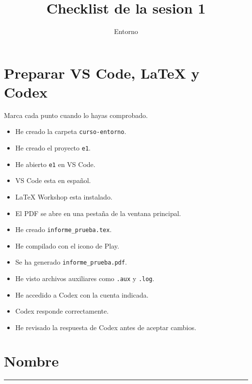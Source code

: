 \documentclass[a4paper,12pt]{article}
\title{Checklist de la sesion 1}
\author{Entorno}
\date{}
\begin{document}
\maketitle

\section*{Preparar VS Code, LaTeX y Codex}

Marca cada punto cuando lo hayas comprobado.

\begin{itemize}
    \item[$\square$] He creado la carpeta \texttt{curso-entorno}.
    \item[$\square$] He creado el proyecto \texttt{e1}.
    \item[$\square$] He abierto \texttt{e1} en VS Code.
    \item[$\square$] VS Code esta en español.
    \item[$\square$] LaTeX Workshop esta instalado.
    \item[$\square$] El PDF se abre en una pestaña de la ventana principal.
    \item[$\square$] He creado \texttt{informe\_prueba.tex}.
    \item[$\square$] He compilado con el icono de Play.
    \item[$\square$] Se ha generado \texttt{informe\_prueba.pdf}.
    \item[$\square$] He visto archivos auxiliares como \texttt{.aux} y \texttt{.log}.
    \item[$\square$] He accedido a Codex con la cuenta indicada.
    \item[$\square$] Codex responde correctamente.
    \item[$\square$] He revisado la respuesta de Codex antes de aceptar cambios.
\end{itemize}

\section*{Nombre}

\vspace{1cm}

\hrule
\end{document}
